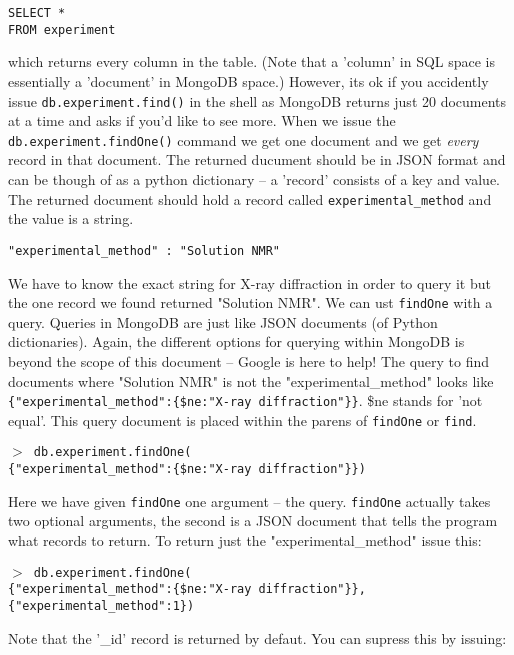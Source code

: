 \documentclass[12pt]{article}
\newcommand{\mdbcmdline}[1]{\vspace{5mm} \noindent
\texttt{$>$ #1}
\vspace{5mm}

}
\begin{document}
\vspace{5mm}
\noindent
\texttt{SELECT *\\
FROM experiment}

\vspace{5mm}
\noindent
which returns every column in the table. 
(Note that a 'column' in SQL space is essentially a 'document' in MongoDB space.)
However, its ok if you accidently issue \texttt{db.experiment.find()} in the shell as MongoDB returns just 20 documents at a time and asks if you'd like to see more.
When we issue the \texttt{db.experiment.findOne()} command we get one document and we get \textit{every} record in that document.
The returned ducument should be in JSON format and can be though of as a python dictionary -- a 'record' consists of a key and value.
The returned document should hold a record called \texttt{experimental\_method} and the value is a string.

\vspace{5mm}
\noindent
\texttt{"experimental\_method" : "Solution NMR"}

\vspace{5mm}
\noindent
We have to know the exact string for X-ray diffraction in order to query it but the one record we found returned "Solution NMR".
We can ust \texttt{findOne} with a query.
Queries in MongoDB are just like JSON documents (of Python dictionaries).
Again, the different options for querying within MongoDB is beyond the scope of this document -- Google is here to help!
The query to find documents where "Solution NMR" is not the "experimental\_method" looks like \texttt{\{"experimental\_method":\{\$ne:"X-ray diffraction"\}\}}. \$ne stands for 'not equal'.
This query document is placed within the parens of \texttt{findOne} or \texttt{find}.

\mdbcmdline{db.experiment.findOne(\\
\{"experimental\_method":\{\$ne:"X-ray diffraction"\}\})}
\noindent
Here we have given \texttt{findOne} one argument -- the query. 
\texttt{findOne} actually takes two optional arguments, the second is a JSON document that tells the program what records to return.
To return just the "experimental\_method" issue this:

\mdbcmdline{db.experiment.findOne(\\
\{"experimental\_method":\{\$ne:"X-ray diffraction"\}\}, \\
\{"experimental\_method":1\})
}

\noindent
Note that the '\_id' record is returned by defaut.
You can supress this by issuing:
\end{document}
